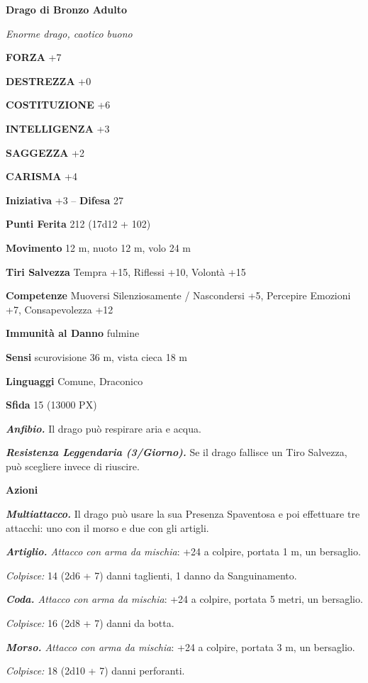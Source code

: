\begin{multicols}{2}
	\medskip{}\textbf{Drago di Bronzo Adulto}

	\textit{Enorme drago, caotico buono}

	\textbf{FORZA} +7

	\textbf{DESTREZZA} +0

	\textbf{COSTITUZIONE} +6

	\textbf{INTELLIGENZA} +3

	\textbf{SAGGEZZA} +2

	\textbf{CARISMA} +4

	\textbf{Iniziativa} +3 -- \textbf{Difesa} 27

	\textbf{Punti Ferita} 212 (17d12 + 102)

	\textbf{Movimento} 12 m, nuoto 12 m, volo 24 m

	\textbf{Tiri Salvezza} Tempra +15, Riflessi +10, Volontà +15

	\textbf{Competenze} Muoversi Silenziosamente / Nascondersi +5, Percepire Emozioni +7, Consapevolezza +12

	\textbf{Immunità al Danno} fulmine

	\textbf{Sensi} scurovisione 36 m, vista cieca 18 m

	\textbf{Linguaggi} Comune, Draconico

	\textbf{Sfida} 15 (13000 PX)

	\textit{\textbf{Anfibio.}} Il drago può respirare aria e acqua.

	\textit{\textbf{Resistenza Leggendaria (3/Giorno).}} Se il drago fallisce un Tiro Salvezza, può scegliere invece di riuscire.

	\textbf{Azioni}

	\textit{\textbf{Multiattacco.}} Il drago può usare la sua Presenza Spaventosa e poi effettuare tre attacchi: uno con il morso e due con gli artigli.

	\textit{\textbf{Artiglio.} Attacco con arma da mischia}: +24 a colpire, portata 1 m, un bersaglio.

	\textit{Colpisce:} 14 (2d6 + 7) danni taglienti, 1 danno da Sanguinamento.

	\textit{\textbf{Coda.} Attacco con arma da mischia}: +24 a colpire, portata 5 metri, un bersaglio.

	\textit{Colpisce:} 16 (2d8 + 7) danni da botta.

	\textit{\textbf{Morso.} Attacco con arma da mischia}: +24 a colpire, portata 3 m, un bersaglio.

	\textit{Colpisce:} 18 (2d10 + 7) danni perforanti.


\end{multicols}
